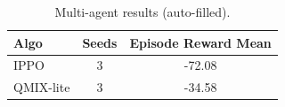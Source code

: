 \begin{table}[h]
\centering
\caption{Multi-agent results (auto-filled).}
\label{tab:marlresults}
\begin{tabular}{lcc}
\toprule
Algo & Seeds & Episode Reward Mean \\
\midrule
IPPO & 3 & -72.08 \\
QMIX-lite & 3 & -34.58 \\
\bottomrule
\end{tabular}
\end{table}
